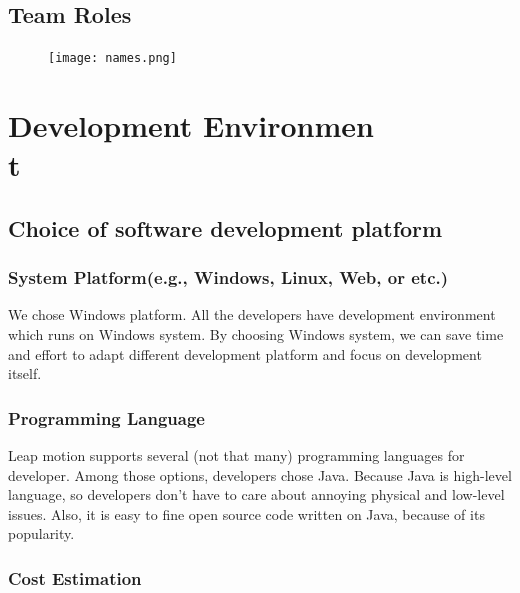 \documentclass[10pt,journal,compsoc]{IEEEtran}
\begin{document}
\subsection{Team Roles}
\begin{figure}[H]
\centering
\texttt{[image: names.png]}
{\caption*{}}
\end{figure}

\ifCLASSOPTIONcompsoc
{}
\else
\section{Development Environmen\\t}
\label{sec:Development Environment\\}
\fi

\subsection{Choice of software development platform}

\subsubsection{System Platform(e.g., Windows, Linux, Web, or etc.)}

We chose Windows platform. All the developers have development environment which runs on Windows system. By choosing Windows system, we can save time and effort to adapt different development platform and focus on development itself.

\subsubsection{Programming Language}

Leap motion supports several (not that many) programming languages for developer. Among those options, developers chose Java. Because Java is high-level language, so developers don’t have to care about annoying physical and low-level issues. Also, it is easy to fine open source code written on Java, because of its popularity.

\subsubsection{Cost Estimation}
\end{document}
